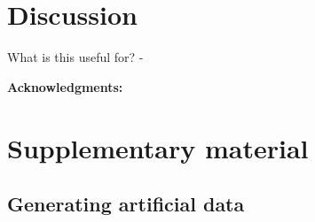 \documentclass[preprint,amsmath,amssymb,superscriptaddress,showpacs,pre]{revtex4-1}
\begin{document}
  



\section{Discussion}
\label{sec:discussion}

What is this useful for? 
- 



\textbf{Acknowledgments:} 





\clearpage




\newpage
\appendix
\setcounter{figure}{0}
\renewcommand{\figurename}{Figure S}
\setcounter{table}{0}
\renewcommand{\tablename}{Table S}

\section{Supplementary material} %
\label{sec:supplementary_material}


\subsection{Generating artificial data} %
\label{sub:generating_artificial_data}
\end{document}
